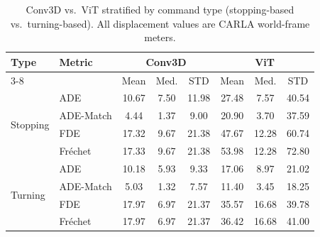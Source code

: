 \begin{table}[ht]
\begin{center}
\small
\begin{tabular}{|l|l|ccc|ccc|}
\hline
\multirow{2}{*}{Type} & \multirow{2}{*}{Metric} & \multicolumn{3}{c|}{Conv3D} & \multicolumn{3}{c|}{ViT} \\ \cline{3-8}
 & & Mean & Med. & STD & Mean & Med. & STD \\ \hline
\multirow{4}{*}{Stopping} & ADE & 10.67 & 7.50 & 11.98 & 27.48 & 7.57 & 40.54 \\
 & ADE-Match & 4.44 & 1.37 & 9.00 & 20.90 & 3.70 & 37.59 \\
 & FDE & 17.32 & 9.67 & 21.38 & 47.67 & 12.28 & 60.74 \\
 & Fr\'{e}chet & 17.33 & 9.67 & 21.38 & 53.98 & 12.28 & 72.80 \\ \hline
\multirow{4}{*}{Turning} & ADE & 10.18 & 5.93 & 9.33 & 17.06 & 8.97 & 21.02 \\
 & ADE-Match & 5.03 & 1.32 & 7.57 & 11.40 & 3.45 & 18.25 \\
 & FDE & 17.97 & 6.97 & 21.37 & 35.57 & 16.68 & 39.78 \\
 & Fr\'{e}chet & 17.97 & 6.97 & 21.37 & 36.42 & 16.68 & 41.00 \\ \hline
\end{tabular}
\end{center}
\caption{Conv3D vs.\ ViT stratified by command type (stopping-based vs.\ turning-based). All displacement values are CARLA world-frame meters.}
\label{table:cmd_type}
\end{table}

